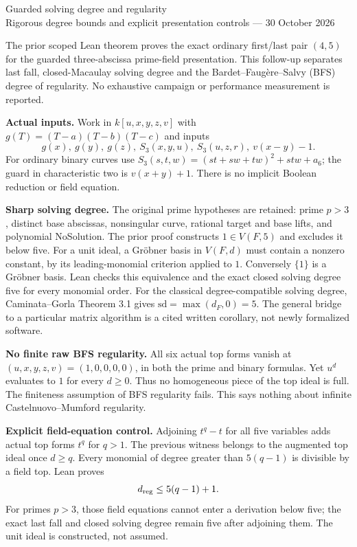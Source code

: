 \documentclass[10pt]{article}
\begin{document}
\begin{center}{\Large Guarded solving degree and regularity}\\
Rigorous degree bounds and explicit presentation controls --- 30 October 2026\end{center}

The prior scoped Lean theorem proves the exact ordinary first/last pair
$(4,5)$ for the guarded three-abscissa prime-field presentation. This
follow-up separates last fall, closed-Macaulay solving degree and the
Bardet--Faug\`ere--Salvy (BFS) degree of regularity. No exhaustive campaign
or performance measurement is reported.

\textbf{Actual inputs.} Work in $k[u,x,y,z,v]$ with
$g(T)=(T-a)(T-b)(T-c)$ and inputs
\[
 g(x),\ g(y),\ g(z),\ S_3(x,y,u),\ S_3(u,z,r),\ v(x-y)-1.
\]
For ordinary binary curves use
$S_3(s,t,w)=(st+sw+tw)^2+stw+a_6$; the guard in characteristic two is
$v(x+y)+1$. There is no implicit Boolean reduction or field equation.

\textbf{Sharp solving degree.} The original prime hypotheses are retained:
prime $p>3$, distinct base abscissas, nonsingular curve, rational target
and base lifts, and polynomial NoSolution. The prior proof constructs
$1\in V(F,5)$ and excludes it below five. For a unit ideal, a Gr\"obner
basis in $V(F,d)$ must contain a nonzero constant, by its leading-monomial
criterion applied to $1$. Conversely $\{1\}$ is a Gr\"obner basis. Lean
checks this equivalence and the exact closed solving degree five for every
monomial order. For the classical degree-compatible solving degree,
Caminata--Gorla Theorem 3.1 gives $\mathrm{sd}=\max(d_F,0)=5$.
The general bridge to a particular matrix algorithm is a cited written
corollary, not newly formalized software.

\textbf{No finite raw BFS regularity.} All six actual top forms vanish at
$(u,x,y,z,v)=(1,0,0,0,0)$, in both the prime and binary formulas. Yet
$u^d$ evaluates to $1$ for every $d\geq0$. Thus no homogeneous piece of
the top ideal is full. The finiteness assumption of BFS regularity fails.
This says nothing about infinite Castelnuovo--Mumford regularity.

\textbf{Explicit field-equation control.} Adjoining $t^q-t$ for all five
variables adds actual top forms $t^q$ for $q>1$. The previous witness
belongs to the augmented top ideal once $d\geq q$. Every monomial of
degree greater than $5(q-1)$ is divisible by a field top. Lean proves
\[ d_{\rm reg}\leq 5(q-1)+1. \]
For primes $p>3$, those field equations cannot enter a derivation below
five; the exact last fall and closed solving degree remain five after
adjoining them. The unit ideal is constructed, not assumed.
\end{document}
